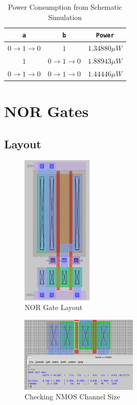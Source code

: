 \documentclass{article}
\begin{document}
	\begin{table}[H]
	\begin{center}
	\caption{Power Consumption from Schematic Simulation}
	\label{table::nand_gate_power_analysis_schem}
	\begin{tabular}{| c | c | c |}
		\hline
		\texttt{a} & \texttt{b} & \texttt{Power}\\
		\hline	
		$0 \rightarrow 1 \rightarrow 0$ & $1$ & $1.34880{\mu}W$ \\
		\hline	
		$1$ & $0 \rightarrow 1 \rightarrow 0$ & $1.88943{\mu}W$ \\
		\hline	
		$0 \rightarrow 1 \rightarrow 0$ & $0 \rightarrow 1 \rightarrow 0$ & $1.44446{\mu}W$\\
		\hline
	\end{tabular}
	\end{center}
	\end{table}
	
	\section{NOR Gates}
	
	\subsection{Layout}
	
	\begin{figure}[H]
		\centerline{\includegraphics[width=0.3\textwidth]{nor_layout.png}}
		\caption{NOR Gate Layout}
		\label{fig::nor_layout}
	\end{figure}
	
	\begin{figure}[H]
		\centerline{\includegraphics[width=0.5\textwidth]{nor_nmos_channel_sizing.png}}
		\caption{Checking NMOS Channel Size}
		\label{fig::nor_nmos_channel_sizing}
	\end{figure}
	
\end{document}
